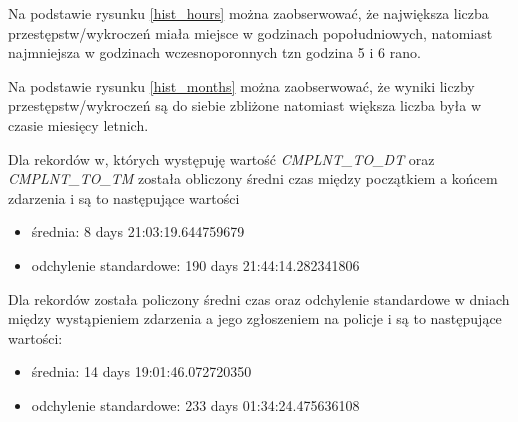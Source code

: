 \documentclass{classrep}
\begin{document}
{{{                Na podstawie rysunku \ref{hist_hours} można zaobserwować, że największa liczba przestępstw/wykroczeń miała miejsce w godzinach popołudniowych, natomiast najmniejsza w godzinach wczesnoporonnych tzn godzina 5 i 6 rano.
                
                Na podstawie rysunku \ref{hist_months} można zaobserwować, że wyniki liczby przestępstw/wykroczeń są do siebie zbliżone natomiast większa liczba była w czasie miesięcy letnich.
                
                Dla rekordów w, których występuję wartość \emph{CMPLNT\_TO\_DT} oraz \emph{CMPLNT\_TO\_TM} została obliczony średni czas między początkiem a końcem zdarzenia i są to następujące wartości
                \begin{itemize}
                    \item średnia: 8 days 21:03:19.644759679
                    \item odchylenie standardowe: 190 days 21:44:14.282341806
                \end{itemize}
                
                Dla rekordów została policzony średni czas oraz odchylenie standardowe w dniach między wystąpieniem zdarzenia a jego zgłoszeniem na policje i są to następujące wartości:
                \begin{itemize}
                    \item średnia: 14 days 19:01:46.072720350
                    \item odchylenie standardowe: 233 days 01:34:24.475636108
                \end{itemize}
            
            }

}}
\end{document}
